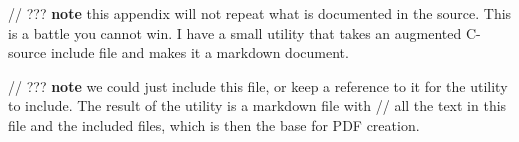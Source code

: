 
// ??? \textbf{note} this appendix will not repeat what is documented in the source. This is a battle you cannot win. I have a small utility that takes an augmented C-source include file and makes it a markdown document. 

// ??? \textbf{note} we could just include this file, or keep a reference to it for the utility to include. The result of the utility is a markdown file with
// all the text in this file and the included files, which is then the base for PDF creation.
